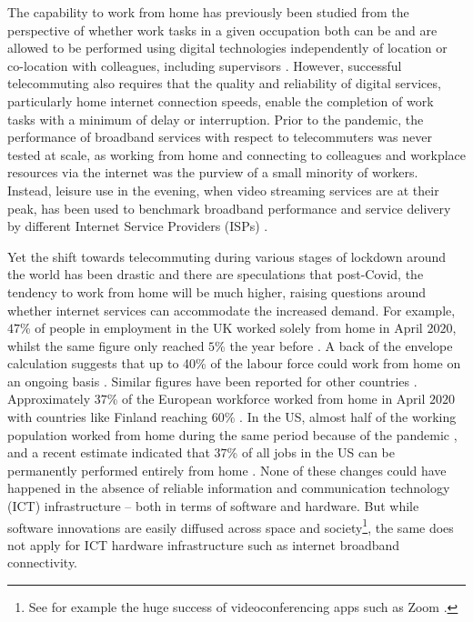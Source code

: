 \documentclass[]{interact}
\theoremstyle{plain}%
\theoremstyle{definition}
\theoremstyle{remark}
\begin{document}
The capability to work from home has previously been studied from the
perspective of whether work tasks in a given occupation both can be and
are allowed to be performed using digital technologies independently of
location or co-location with colleagues, including supervisors
\citep{allen2015effective, singh2013modeling}. However, successful
telecommuting also requires that the quality and reliability of digital
services, particularly home internet connection speeds, enable the
completion of work tasks with a minimum of delay or interruption. Prior
to the pandemic, the performance of broadband services with respect to
telecommuters was never tested at scale, as working from home and
connecting to colleagues and workplace resources via the internet was
the purview of a small minority of workers. Instead, leisure use in the
evening, when video streaming services are at their peak, has been used
to benchmark broadband performance and service delivery by different
Internet Service Providers (ISPs) \citep{ofcom2017}.

Yet the shift towards telecommuting during various stages of lockdown
around the world has been drastic and there are speculations that
post-Covid, the tendency to work from home will be much higher, raising
questions around whether internet services can accommodate the increased
demand. For example, \(47\)\% of people in employment in the UK worked
solely from home in April \(2020\), whilst the same figure only reached
\(5\)\% the year before \citep{ons2020, ons2020lm2019}. A back of the
envelope calculation suggests that up to 40\% of the labour force could
work from home on an ongoing basis \citep{batty2020editorial}. Similar
figures have been reported for other countries
\citep{felstead2020homeworking}. Approximately \(37\)\% of the European
workforce worked from home in April \(2020\) with countries like Finland
reaching \(60\)\% \citep{eurofound2020}. In the US, almost half of the
working population worked from home during the same period because of
the pandemic \citep{brynjolfsson2020covid}, and a recent estimate
indicated that \(37\)\% of all jobs in the US can be permanently
performed entirely from home \citep{NBERw26948}. None of these changes
could have happened in the absence of reliable information and
communication technology (ICT) infrastructure -- both in terms of
software and hardware. But while software innovations are easily
diffused across space and society\footnote{See for example the huge
  success of videoconferencing apps such as Zoom \citep{marks2020zoom}.},
the same does not apply for ICT hardware infrastructure such as internet
broadband connectivity.
\end{document}
